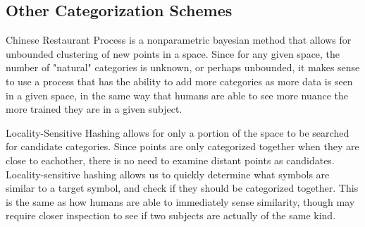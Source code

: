 \subsection{Other Categorization Schemes} 
Chinese Restaurant Process is a nonparametric bayesian method that allows for unbounded clustering of new points in a space. Since for any given space, the number of "natural" categories is unknown, or perhaps unbounded, it makes sense to use a process that has the ability to add more categories as more data is seen in a given space, in the same way that humans are able to see more nuance the more trained they are in a given subject.

Locality-Sensitive Hashing allows for only a portion of the space to be searched for candidate categories.  Since points are only categorized together when they are close to eachother, there is no need to examine distant points as candidates.  Locality-sensitive hashing allows us to quickly determine what symbols are similar to a target symbol, and check if they should be categorized together.  This is the same as how humans are able to immediately sense similarity, though may require closer inspection to see if two subjects are actually of the same kind.

